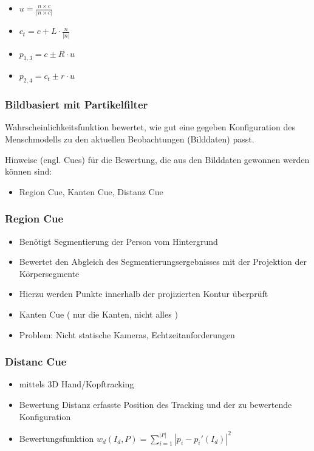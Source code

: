 \begin{itemize}
	\item $u=\frac{n\times c}{\left|n\times c\right|}$
	\item $c_t=c+L \cdot \frac{n}{\left|n\right|}$
	\item $p_{1,3}=c \pm R \cdot u$
	\item $p_{2,4}=c_t \pm r \cdot u$
\end{itemize}

\subsubsection{Bildbasiert mit Partikelfilter}
Wahrscheinlichkeitsfunktion bewertet, wie gut eine gegeben Konfiguration des Menschmodells zu den aktuellen Beobachtungen (Bilddaten) passt.

Hinweise (engl. Cues) für die Bewertung, die aus den Bilddaten gewonnen werden können sind:
\begin{itemize}
	\item Region Cue, Kanten Cue, Distanz Cue
\end{itemize}

\subsubsection{Region Cue}
\begin{itemize}
	\item Benötigt Segmentierung der Person vom Hintergrund
	\item Bewertet den Abgleich des Segmentierungsergebnisses mit der Projektion der Körpersegmente
	\item Hierzu werden Punkte innerhalb der projizierten Kontur überprüft
	\item Kanten Cue ( nur die Kanten, nicht alles )
	\item Problem: Nicht statische Kameras, Echtzeitanforderungen
\end{itemize}

\subsubsection{Distanc Cue}
\begin{itemize}
	\item mittels 3D Hand/Kopftracking
	\item Bewertung Distanz  erfasste Position des Tracking und der zu bewertende Konfiguration
	\item Bewertungsfunktion $w_d(I_d, P) = \sum_{i=1}^{|P|} |p_i - p_i'(I_d)|^2$
\end{itemize}

